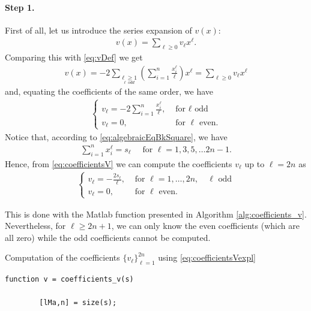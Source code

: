 \documentclass[a4paper]{article}
\numberwithin{equation}{section}
\begin{document}
{\paragraph{Step 1.} First of all, let us introduce the series expansion of $v(x)$:
\begin{align*}
	v(x) = \sum_{\ell\geq 0} v_\ell x^\ell.
\end{align*} 
Comparing this with \eqref{eq:vDef}	we get
\begin{align*}
	v(x) = -2\sum_{\underset{\ell\; odd}{\ell\geq 1}}\left(\sum_{i=1}^n \frac{x_i^\ell}{\ell}\right) x^\ell = \sum_{\ell\geq 0} v_\ell x^\ell
\end{align*}
and, equating the coefficients of the same order, we have
\begin{align}\label{eq:coefficientsV}
	\begin{cases}
		\displaystyle v_\ell=-2\sum_{i=1}^n\frac{x_i^\ell}{\ell}, &\mbox{ for } \ell \mbox{ odd}
		\\
		v_\ell=0, &\mbox{ for } \ell \mbox{ even}.
	\end{cases}
\end{align}
Notice that, according to \eqref{eq:algebraicEqBkSquare}, we have
\begin{align*}
	\sum_{i=1}^n x_i^\ell = s_\ell \quad\mbox{ for }\ell = 1,3,5,\ldots 2n-1.
\end{align*}
Hence, from \eqref{eq:coefficientsV} we can compute the coefficients $v_\ell$ up to $\ell = 2n$ as
\begin{align}\label{eq:coefficientsVexpl}
	\begin{cases}
		\displaystyle v_\ell=-\frac{2s_\ell}{\ell}, &\mbox{ for } \ell = 1,\ldots, 2n,\quad\ell \mbox{ odd}
		\\
		v_\ell=0, &\mbox{ for } \ell \mbox{ even}.
	\end{cases}
\end{align}

This is done with the Matlab function presented in Algorithm \ref{alg:coefficients_v}. Nevertheless, for $\ell\geq 2n+1$, we can only know the even coefficients (which are all zero) while the odd coefficients cannot be computed.
\begin{algorithm}
	\caption{Computation of the coefficients $\{v_\ell\}_{\ell=1}^{2n}$ using \eqref{eq:coefficientsVexpl}} \label{alg:coefficients_v}
	\begin{lstlisting}[style=Matlab-editor, basicstyle=\mlttfamily\footnotesize]
		function v = coefficients_v(s)
		
		[lMa,n] = size(s);
		

\end{lstlisting}
\end{algorithm}}
\end{document}
